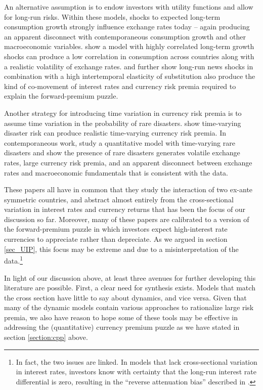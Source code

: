 \documentclass{ar-1col}
\begin{document}
An alternative assumption is to endow investors with \cite{EpsteinZin1989} utility functions and allow for long-run risks. Within these models, shocks to expected long-term consumption growth strongly influence exchange rates today -- again producing an apparent disconnect with contemporaneous consumption growth and other macroeconomic variables. \citet{ColacitoCroce2011} show a model with highly correlated long-term growth shocks can produce a low correlation in consumption across countries along with a realistic volatility of exchange rates. \citet{BansalShaliastovich2012} and \citet{ColacitoCroce2013} further show long-run news shocks in combination with a high intertemporal elasticity of substitution also produce the kind of co-movement of interest rates and currency risk premia required to explain the forward-premium puzzle. 

Another strategy for introducing time variation in currency risk premia is to assume time variation in the probability of rare disasters. \citet{FarhiGabaix2016} show time-varying disaster risk can produce realistic time-varying currency risk premia. In contemporaneous work, \citet{GourioSiemerVerdelhan2011} study a quantitative model with time-varying rare disasters and show the presence of rare disasters generates volatile exchange rates, large currency risk premia, and an apparent disconnect between exchange rates and macroeconomic fundamentals that is consistent with the data.

These papers all have in common that they study the interaction of two ex-ante symmetric countries, and abstract almost entirely from the cross-sectional variation in interest rates and currency returns that has been the focus of our discussion so far. Moreover, many of these papers are calibrated to a version of the forward-premium puzzle in which investors expect high-interest rate currencies to appreciate rather than depreciate. As we argued in section \ref{sec_UIP}, this focus may be extreme and due to a misinterpretation of the data.\footnote{In fact, the two issues are linked. In models that lack cross-sectional variation in interest rates, investors know with certainty that the long-run interest rate differential is zero, resulting in the ``reverse attenuation bias'' described in \cite{HassanMano2019}.} 

In light of our discussion above, at least three avenues for further developing this literature are possible. First, a clear need for synthesis exists. Models that match the cross section have little to say about dynamics, and vice versa. Given that many of the dynamic models contain various approaches to rationalize large risk premia, we also have reason to hope some of these tools may be effective in addressing the (quantitative) currency premium puzzle as we have stated in section \ref{section:cpp} above. 
\end{document}
